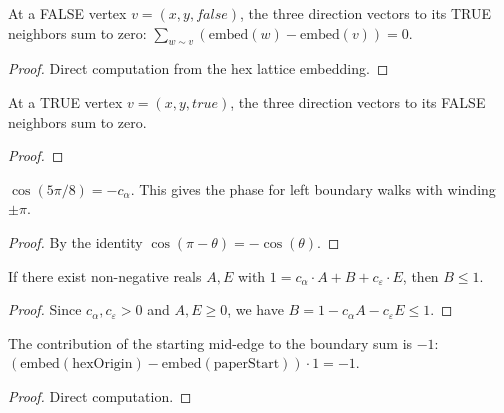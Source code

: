 \begin{lemma}
\begin{enumerate}
\begin{lemma}\label{lem:dir-sum-false}
\leanok
  At a FALSE vertex $v = (x,y,\mathit{false})$, the three direction
  vectors to its TRUE neighbors sum to zero:
  $\sum_{w \sim v} (\text{embed}(w) - \text{embed}(v)) = 0$.
\end{lemma}
\begin{proof}
\leanok
  Direct computation from the hex lattice embedding.
\end{proof}

\begin{lemma}\label{lem:dir-sum-true}
\leanok
  At a TRUE vertex $v = (x,y,\mathit{true})$, the three direction
  vectors to its FALSE neighbors sum to zero.
\end{lemma}
\begin{proof}
\leanok
\end{proof}

\begin{lemma}[Boundary phase: $\cos(5\pi/8) = -c_\alpha$]\label{lem:cos-5pi8}
\leanok
  $\cos(5\pi/8) = -c_\alpha$. This gives the phase for left boundary
  walks with winding $\pm\pi$.
\end{lemma}
\begin{proof}
\leanok
  By the identity $\cos(\pi - \theta) = -\cos(\theta)$.
\end{proof}

\begin{lemma}\label{lem:B-le-1-abstract}
\leanok
{}
  If there exist non-negative reals $A, E$ with
  $1 = c_\alpha \cdot A + B + c_\varepsilon \cdot E$,
  then $B \leq 1$.
\end{lemma}
\begin{proof}
\leanok
  Since $c_\alpha, c_\varepsilon > 0$ and $A, E \geq 0$,
  we have $B = 1 - c_\alpha A - c_\varepsilon E \leq 1$.
\end{proof}

\begin{lemma}\label{lem:starting-contrib}
\leanok
  The contribution of the starting mid-edge to the boundary sum is $-1$:
  $(\text{embed}(\text{hexOrigin}) - \text{embed}(\text{paperStart})) \cdot 1 = -1$.
\end{lemma}
\begin{proof}
\leanok
  Direct computation.
\end{proof}


\end{enumerate}
\end{lemma}
